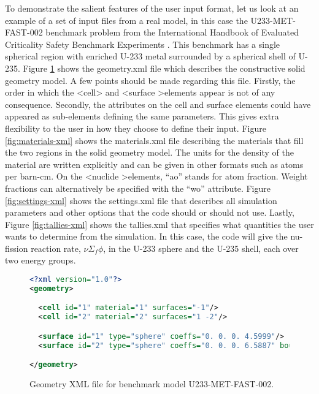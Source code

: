 \documentclass{elsarticle}
\begin{document}
To demonstrate the salient features of the user input format, let us look at an
example of a set of input files from a real model, in this case the
U233-MET-FAST-002 benchmark problem from the International Handbook of Evaluated
Criticality Safety Benchmark Experiments \cite{icsbep}. This benchmark has a
single spherical region with enriched U-233 metal surrounded by a spherical
shell of U-235. Figure \ref{fig:geometry-xml} shows the geometry.xml file which
describes the constructive solid geometry model. A few points should be made
regarding this file. Firstly, the order in which the \textless cell\textgreater
and \textless surface \textgreater elements appear is not of any
consequence. Secondly, the attributes on the cell and surface elements could
have appeared as sub-elements defining the same parameters. This gives extra
flexibility to the user in how they choose to define their input. Figure
\ref{fig:materials-xml} shows the materials.xml file describing the materials
that fill the two regions in the solid geometry model. The units for the density
of the material are written explicitly and can be given in other formats such as
atoms per barn-cm. On the \textless nuclide \textgreater elements, ``ao'' stands
for atom fraction. Weight fractions can alternatively be specified with the
``wo'' attribute. Figure \ref{fig:settings-xml} shows the settings.xml file that
describes all simulation parameters and other options that the code should or
should not use. Lastly, Figure \ref{fig:tallies-xml} shows the tallies.xml that
specifies what quantities the user wants to determine from the simulation. In
this case, the code will give the nu-fission reaction rate, $\nu\Sigma_f\phi$,
in the U-233 sphere and the U-235 shell, each over two energy groups.

\begin{figure}
  \begin{lstlisting}[language=xml]
<?xml version="1.0"?>
<geometry>

  <cell id="1" material="1" surfaces="-1"/>
  <cell id="2" material="2" surfaces="1 -2"/>

  <surface id="1" type="sphere" coeffs="0. 0. 0. 4.5999"/>
  <surface id="2" type="sphere" coeffs="0. 0. 0. 6.5887" boundary="vacuum"/>

</geometry>
  \end{lstlisting}
  \caption{Geometry XML file for benchmark model U233-MET-FAST-002.}
  \label{fig:geometry-xml}
\end{figure}
\end{document}
